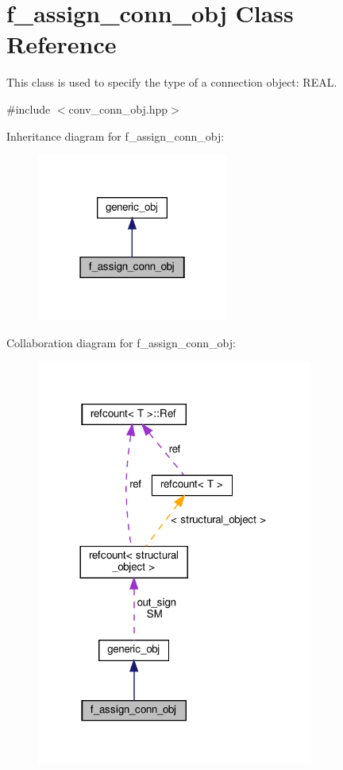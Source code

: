 \hypertarget{classf__assign__conn__obj}{}\section{f\+\_\+assign\+\_\+conn\+\_\+obj Class Reference}
\label{classf__assign__conn__obj}


This class is used to specify the type of a connection object\+: R\+E\+AL.  




{\ttfamily \#include $<$conv\+\_\+conn\+\_\+obj.\+hpp$>$}



Inheritance diagram for f\+\_\+assign\+\_\+conn\+\_\+obj\+:
\nopagebreak
\begin{figure}[H]
\begin{center}
\leavevmode
\includegraphics[width=178pt]{db/d6c/classf__assign__conn__obj__inherit__graph}
\end{center}
\end{figure}


Collaboration diagram for f\+\_\+assign\+\_\+conn\+\_\+obj\+:
\nopagebreak
\begin{figure}[H]
\begin{center}
\leavevmode
\includegraphics[width=257pt]{de/da6/classf__assign__conn__obj__coll__graph}
\end{center}
\end{figure}
